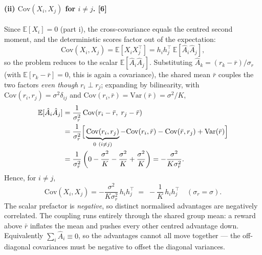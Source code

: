 \documentclass[11pt,a4paper]{article}
\begin{document}
\paragraph{(ii) $\mathrm{Cov}(X_i,X_j)$ for $i\neq j$. \hfill\textnormal{[6]}}
Since $\mathbb{E}[X_i]=0$ (part i), the cross-covariance equals the centred second moment, and
the deterministic scores factor out of the expectation:
\begin{equation}
  \mathrm{Cov}(X_i,X_j)=\mathbb{E}[X_iX_j^{\top}]=h_ih_j^{\top}\,\mathbb{E}[\hat A_i\hat A_j],
  \label{eq:q1-cov-factor}
\end{equation}
so the problem reduces to the scalar $\mathbb{E}[\hat A_i\hat A_j]$. Substituting
$\hat A_k=(r_k-\bar r)/\sigma_r$ (with $\mathbb{E}[r_k-\bar r]=0$, this is again a covariance),
the shared mean $\bar r$ couples the two factors \emph{even though} $r_i\perp r_j$; expanding by
bilinearity, with $\mathrm{Cov}(r_i,r_j)=\sigma^2\delta_{ij}$ and
$\mathrm{Cov}(r_i,\bar r)=\mathrm{Var}(\bar r)=\sigma^2/K$,
\begin{align*}
  \mathbb{E}[\hat A_i\hat A_j]
    &= \frac{1}{\sigma_r^{2}}\,\mathrm{Cov}(r_i-\bar r,\;r_j-\bar r) \\
    &= \frac{1}{\sigma_r^{2}}\Bigl[\,\underbrace{\mathrm{Cov}(r_i,r_j)}_{0\ (i\neq j)}
       -\mathrm{Cov}(r_i,\bar r)-\mathrm{Cov}(\bar r,r_j)+\mathrm{Var}(\bar r)\Bigr] \\
    &= \frac{1}{\sigma_r^{2}}\left(0-\frac{\sigma^2}{K}-\frac{\sigma^2}{K}+\frac{\sigma^2}{K}\right)
     = -\frac{\sigma^2}{K\sigma_r^{2}}.
\end{align*}
Hence, for $i\neq j$,
\begin{equation}
  \mathrm{Cov}(X_i,X_j)=-\frac{\sigma^2}{K\sigma_r^{2}}\,h_ih_j^{\top}
  \;=\;-\frac{1}{K}\,h_ih_j^{\top}\quad(\sigma_r=\sigma).
  \label{eq:q1-cov}
\end{equation}
The scalar prefactor is \emph{negative}, so distinct normalised advantages are negatively
correlated. The coupling runs entirely through the shared group mean: a reward above $\bar r$
inflates the mean and pushes every other centred advantage down. Equivalently
$\sum_i\hat A_i\equiv0$, so the advantages cannot all move together --- the off-diagonal
covariances must be negative to offset the diagonal variances.
\end{document}
